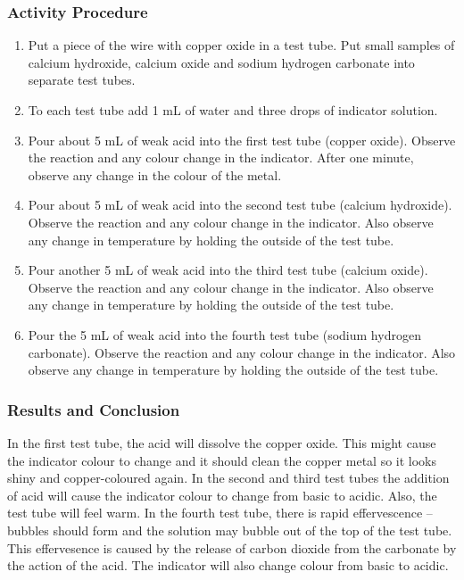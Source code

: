 \subsubsection*{Activity Procedure}
\begin{enumerate}
\item{Put a piece of the wire with copper oxide in a test tube. Put small samples of calcium hydroxide, calcium oxide and sodium hydrogen carbonate into separate test tubes.}
\item{To each test tube add 1 mL of water and three drops of indicator solution.}
\item{Pour about 5 mL of weak acid into the first test tube (copper oxide). Observe the reaction and any colour change in the indicator. After one minute, observe any change in the colour of the metal.}
\item{Pour about 5 mL of weak acid into the second test tube (calcium hydroxide). Observe the reaction and any colour change in the indicator. Also observe any change in temperature by holding the outside of the test tube.}
\item{Pour another 5 mL of weak acid into the third test tube (calcium oxide). Observe the reaction and any colour change in the indicator. Also observe any change in temperature by holding the outside of the test tube.}
\item{Pour the 5 mL of weak acid into the fourth test tube (sodium hydrogen carbonate). Observe the reaction and any colour change in the indicator. Also observe any change in temperature by holding the outside of the test tube.}
\end{enumerate}

\subsubsection*{Results and Conclusion}
In the first test tube, the acid will dissolve the copper oxide. This might cause the indicator colour to change and it should clean the copper metal so it looks shiny and copper-coloured again.
In the second and third test tubes the addition of acid will cause the indicator colour to change from basic to acidic. Also, the test tube will feel warm.
In the fourth test tube, there is rapid effervescence -- bubbles should form and the solution may bubble out of the top of the test tube. This effervesence is caused by the release of carbon dioxide from the carbonate by the action of the acid. The indicator will also change colour from basic to acidic.

